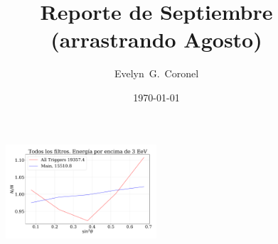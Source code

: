 



\title{Reporte de Septiembre (arrastrando Agosto)}
\author{Evelyn~G.~Coronel}


\date[]{\lowercase{\today}} %


\maketitle

\begin{figure}
    \begin{small}
        \begin{center}
            \includegraphics[width=0.5\textwidth]{eventos_bin_sin_theta.pdf}
        \end{center}
        \caption{}
        \label{fig:}
    \end{small}
\end{figure}


